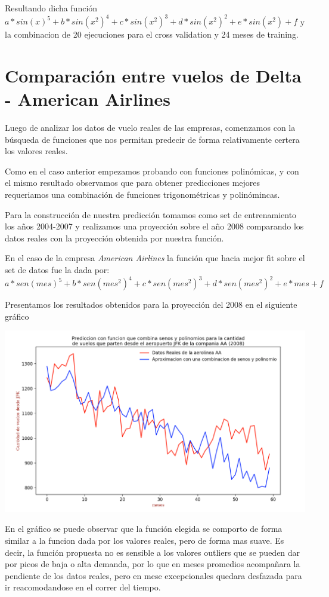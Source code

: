 \documentclass{endm}
\begin{document}
Resultando dicha funci\'on $a*sin(x)^5+b*sin(x^2)^4+c*sin(x^2)^3+d*sin(x^2)^2+e*sin(x^2)+f$ y la combinacion de 20 ejecuciones para el cross validation y 24 meses de training.

\section{Comparaci\'on entre vuelos de Delta - American Airlines}

Luego de analizar los datos de vuelo reales de las empresas, comenzamos con la b\'usqueda de funciones que nos permitan predecir de forma relativamente certera los valores reales.

Como en el caso anterior empezamos probando con funciones polin\'omicas, y con el mismo resultado observamos que para obtener predicciones mejores requeriamos una combinaci\'on de funciones trigonom\'etricas y polin\'omincas.

Para la construcci\'on de nuestra predicci\'on tomamos como set de entrenamiento los a\~nos 2004-2007 y realizamos una proyecci\'on sobre el a\~no 2008 comparando los datos reales con la proyecci\'on obtenida por nuestra funci\'on.

En el caso de la empresa \textit{American Airlines} la funci\'on que hacia mejor fit sobre el set de datos fue la dada por:
$a * sen(mes)^5 + b * sen(mes^2)^4 + c * sen(mes^2)^3 + d * sen(mes^2)^2 + e * mes + f$

Presentamos los resultados obtenidos para la proyecci\'on del 2008 en el siguiente gr\'afico

\begin{center}
\includegraphics[scale=0.4]{imagenes/AA.png}
\end{center}

En el gr\'afico se puede observar que la funci\'on elegida se comporto de forma similar a la funcion dada por los valores reales, pero de forma mas suave. Es decir, la funci\'on propuesta no es sensible a los valores outliers que se pueden dar por picos de baja o alta demanda, por lo que en meses promedios acompa\~nara la pendiente de los datos reales, pero en mese excepcionales quedara desfazada para ir reacomodandose en el correr del tiempo.
\end{document}
